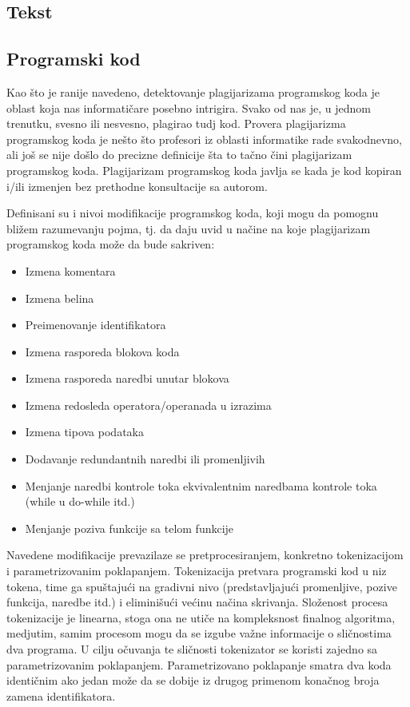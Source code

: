 \documentclass[a4paper]{article}
\begin{document}
\subsection{Tekst}
\label{subsec:tekst}

\subsection{Programski kod}
\label{subsec:programski kod}

Kao što je ranije navedeno, detektovanje plagijarizama programskog koda je oblast koja nas informatičare posebno intrigira. Svako od nas je, u jednom trenutku, svesno ili nesvesno, plagirao tudj kod. Provera plagijarizma programskog koda je nešto što profesori iz oblasti informatike rade svakodnevno, ali još se nije došlo do precizne definicije šta to tačno čini plagijarizam programskog koda. Plagijarizam programskog koda javlja se kada je kod kopiran i/ili izmenjen bez prethodne konsultacije sa autorom. \cite{culwinmacleodlancaster} \newline
\par Definisani su i nivoi modifikacije programskog koda, koji mogu da pomognu bližem razumevanju pojma, tj. da daju uvid u načine na koje plagijarizam programskog koda može da bude sakriven:

\begin{itemize}
\item Izmena komentara
\item Izmena belina
\item Preimenovanje identifikatora
\item Izmena rasporeda blokova koda
\item Izmena rasporeda naredbi unutar blokova
\item Izmena redosleda operatora/operanada u izrazima
\item Izmena tipova podataka
\item Dodavanje redundantnih naredbi ili promenljivih
\item Menjanje naredbi kontrole toka ekvivalentnim naredbama kontrole toka (while u do-while itd.)
\item Menjanje poziva funkcije sa telom funkcije
\end{itemize}

Navedene modifikacije prevazilaze se pretprocesiranjem, konkretno tokenizacijom i parametrizovanim poklapanjem. Tokenizacija pretvara programski kod u niz tokena, time ga spuštajući na gradivni nivo (predstavljajući promenljive, pozive funkcija, naredbe itd.) i eliminišući većinu načina skrivanja. Složenost procesa tokenizacije je linearna, stoga ona ne utiče na kompleksnost finalnog algoritma, medjutim, samim procesom mogu da se izgube važne informacije o sličnostima dva programa. U cilju očuvanja te sličnosti tokenizator se koristi zajedno sa parametrizovanim poklapanjem. Parametrizovano poklapanje smatra dva koda identičnim ako jedan može da se dobije iz drugog primenom konačnog broja zamena identifikatora.
\end{document}
